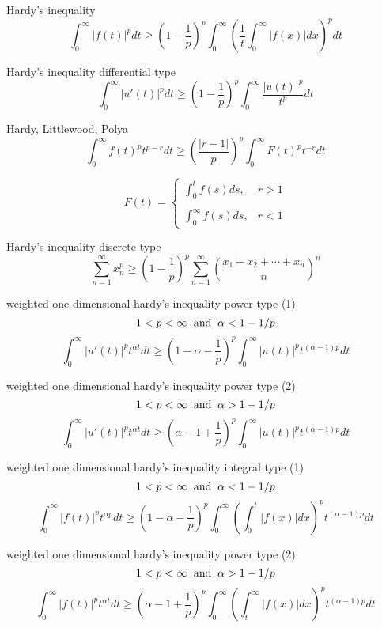 Hardy's inequality
$$
\int^\infty_0|f(t)|^p dt \ge\left(1-\frac{1}{p}\right)^p\int^\infty_0\left(\frac{1}{t}\int^\infty_0|f(x)|dx\right)^p dt
$$

Hardy's inequality differential type
$$
\int^\infty_0|u'(t)|^p dt \ge \left(1-\frac{1}{p}\right)^p\int^\infty_0\frac{|u(t)|^p}{t^p}dt
$$

Hardy, Littlewood, Polya
$$
\int^\infty_0f(t)^pt^{p-r} dt\ge \left(\frac{|r-1|}{p}\right)^p\int^\infty_0F(t)^pt^{-r}dt
$$

$$
F(t)=
\left\{
\begin{array}{ll}
\int^t_0 f(s)ds, & r>1 \\
\\
\int^\infty_0 f(s)ds, & r<1
\end{array}
\right.
$$

Hardy's inequality discrete type
$$
\sum^\infty_{n=1} x^p_n \ge \left(1-\frac{1}{p}\right)^p\sum^\infty_{n=1}\left(\frac{x_1+x_2+\cdots+x_n}{n}\right)^n
$$

weighted one dimensional hardy's inequality power type (1)
$$
1< p <\infty \;\; {\rm and} \;\; \alpha< 1-1/p
$$
$$
\int^\infty_0\left |u'(t)\right|^p t^{\alpha t}dt \ge \left(1-\alpha-\frac{1}{p}\right)^p\int^\infty_0 \left |u(t)\right|^p t^{(\alpha-1)p}dt
$$

weighted one dimensional hardy's inequality power type (2)
$$
1< p <\infty \;\; {\rm and} \;\; \alpha> 1-1/p
$$
$$
\int^\infty_0\left |u'(t)\right|^p t^{\alpha t}dt \ge \left(\alpha-1+\frac{1}{p}\right)^p\int^\infty_0 \left |u(t)\right|^p t^{(\alpha-1)p}dt
$$

weighted one dimensional hardy's inequality integral type (1)
$$
1< p <\infty \;\; {\rm and} \;\; \alpha< 1-1/p
$$
$$
\int^\infty_0\left |f(t)\right|^p t^{\alpha p}dt \ge \left(1-\alpha-\frac{1}{p}\right)^p\int^\infty_0\left(\int_0^t \left |f(x)\right|dx\right)^p t^{(\alpha-1)p}dt
$$

weighted one dimensional hardy's inequality power type (2)
$$
1< p <\infty \;\; {\rm and} \;\; \alpha> 1-1/p
$$
$$
\int^\infty_0\left |f(t)\right|^p t^{\alpha t}dt \ge \left(\alpha-1+\frac{1}{p}\right)^p\int^\infty_0\left(\int^\infty_t\left|f(x)\right|dx\right)^p t^{(\alpha-1)p}dt
$$
